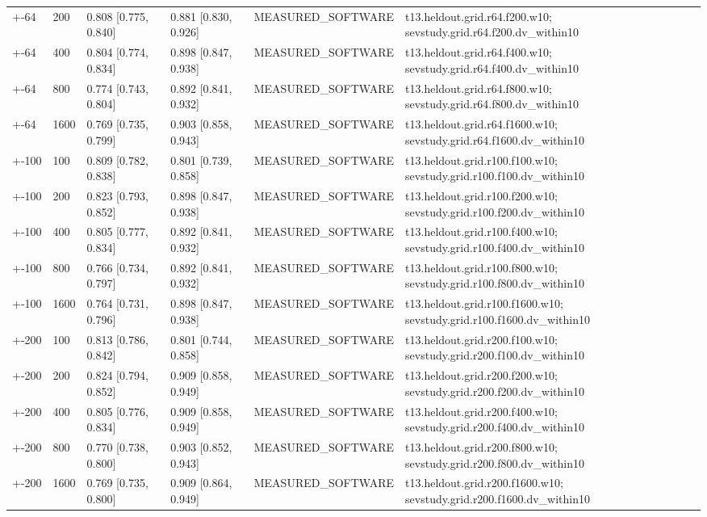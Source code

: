 \begin{table}[t]
\begin{tabular}{llllll}
+-64 & 200 & 0.808 [0.775, 0.840] & 0.881 [0.830, 0.926] & MEASURED\_SOFTWARE & t13.heldout.grid.r64.f200.w10; sevstudy.grid.r64.f200.dv\_within10 \\
+-64 & 400 & 0.804 [0.774, 0.834] & 0.898 [0.847, 0.938] & MEASURED\_SOFTWARE & t13.heldout.grid.r64.f400.w10; sevstudy.grid.r64.f400.dv\_within10 \\
+-64 & 800 & 0.774 [0.743, 0.804] & 0.892 [0.841, 0.932] & MEASURED\_SOFTWARE & t13.heldout.grid.r64.f800.w10; sevstudy.grid.r64.f800.dv\_within10 \\
+-64 & 1600 & 0.769 [0.735, 0.799] & 0.903 [0.858, 0.943] & MEASURED\_SOFTWARE & t13.heldout.grid.r64.f1600.w10; sevstudy.grid.r64.f1600.dv\_within10 \\
+-100 & 100 & 0.809 [0.782, 0.838] & 0.801 [0.739, 0.858] & MEASURED\_SOFTWARE & t13.heldout.grid.r100.f100.w10; sevstudy.grid.r100.f100.dv\_within10 \\
+-100 & 200 & 0.823 [0.793, 0.852] & 0.898 [0.847, 0.938] & MEASURED\_SOFTWARE & t13.heldout.grid.r100.f200.w10; sevstudy.grid.r100.f200.dv\_within10 \\
+-100 & 400 & 0.805 [0.777, 0.834] & 0.892 [0.841, 0.932] & MEASURED\_SOFTWARE & t13.heldout.grid.r100.f400.w10; sevstudy.grid.r100.f400.dv\_within10 \\
+-100 & 800 & 0.766 [0.734, 0.797] & 0.892 [0.841, 0.932] & MEASURED\_SOFTWARE & t13.heldout.grid.r100.f800.w10; sevstudy.grid.r100.f800.dv\_within10 \\
+-100 & 1600 & 0.764 [0.731, 0.796] & 0.898 [0.847, 0.938] & MEASURED\_SOFTWARE & t13.heldout.grid.r100.f1600.w10; sevstudy.grid.r100.f1600.dv\_within10 \\
+-200 & 100 & 0.813 [0.786, 0.842] & 0.801 [0.744, 0.858] & MEASURED\_SOFTWARE & t13.heldout.grid.r200.f100.w10; sevstudy.grid.r200.f100.dv\_within10 \\
+-200 & 200 & 0.824 [0.794, 0.852] & 0.909 [0.858, 0.949] & MEASURED\_SOFTWARE & t13.heldout.grid.r200.f200.w10; sevstudy.grid.r200.f200.dv\_within10 \\
+-200 & 400 & 0.805 [0.776, 0.834] & 0.909 [0.858, 0.949] & MEASURED\_SOFTWARE & t13.heldout.grid.r200.f400.w10; sevstudy.grid.r200.f400.dv\_within10 \\
+-200 & 800 & 0.770 [0.738, 0.800] & 0.903 [0.852, 0.943] & MEASURED\_SOFTWARE & t13.heldout.grid.r200.f800.w10; sevstudy.grid.r200.f800.dv\_within10 \\
+-200 & 1600 & 0.769 [0.735, 0.800] & 0.909 [0.864, 0.949] & MEASURED\_SOFTWARE & t13.heldout.grid.r200.f1600.w10; sevstudy.grid.r200.f1600.dv\_within10 \\
\bottomrule
\end{tabular}
\end{table}
